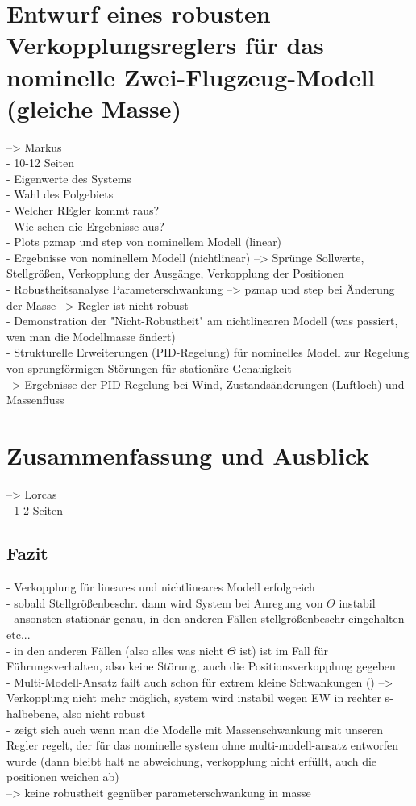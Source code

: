 \section{Entwurf eines robusten Verkopplungsreglers für das nominelle Zwei-Flugzeug-Modell (gleiche Masse)}
--> Markus\\
- 10-12 Seiten \\
- Eigenwerte des Systems\\
- Wahl des Polgebiets\\
- Welcher REgler kommt raus?\\
- Wie sehen die Ergebnisse aus?\\
- Plots pzmap und step von nominellem Modell (linear)\\
- Ergebnisse von nominellem Modell (nichtlinear) --> Sprünge Sollwerte, Stellgrößen, Verkopplung der Ausgänge, Verkopplung der Positionen\\
- Robustheitsanalyse Parameterschwankung --> pzmap und step bei Änderung der Masse --> Regler ist nicht robust\\
- Demonstration der "Nicht-Robustheit" am nichtlinearen Modell (was passiert, wen man die Modellmasse ändert)\\
- Strukturelle Erweiterungen (PID-Regelung) für nominelles Modell zur Regelung von sprungförmigen Störungen für stationäre Genauigkeit \\
--> Ergebnisse der PID-Regelung bei Wind, Zustandsänderungen (Luftloch) und Massenfluss\\
\section{Zusammenfassung und Ausblick}
--> Lorcas\\
- 1-2 Seiten\\
\subsection{Fazit}
- Verkopplung für lineares und nichtlineares Modell erfolgreich \\
- sobald Stellgrößenbeschr. dann wird System bei Anregung von $\Theta$ instabil \\
- ansonsten stationär genau, in den anderen Fällen stellgrößenbeschr eingehalten etc... \\
- in den anderen Fällen (also alles was nicht $\Theta$ ist) ist im Fall für Führungsverhalten, also keine Störung, auch die Positionsverkopplung gegeben  \\
- Multi-Modell-Ansatz failt auch schon für extrem kleine Schwankungen () --> Verkopplung nicht mehr möglich, system wird instabil wegen EW in rechter s-halbebene, also nicht robust \\
- zeigt sich auch wenn man die Modelle mit Massenschwankung mit unseren Regler regelt, der für das nominelle system ohne multi-modell-ansatz entworfen wurde (dann bleibt halt ne abweichung, verkopplung nicht erfüllt, auch die positionen weichen ab)\\
--> keine robustheit gegnüber parameterschwankung in masse\\

